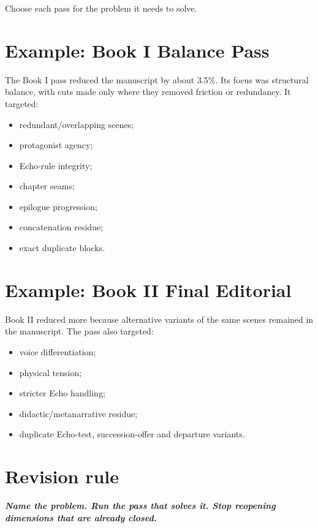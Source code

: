 \documentclass[11pt,oneside,openany]{book}
\renewenvironment{quote}{\begin{insightbox}\itshape}{\end{insightbox}}
\providecommand{\tightlist}{%
  \setlength{\itemsep}{0pt}\setlength{\parskip}{0pt}}
\begin{document}
Choose each pass for the problem it needs to solve.

\section{Example: Book I Balance Pass}\label{example-book-i-balance-pass}

The Book I pass reduced the manuscript by about 3.5\%. Its focus was structural balance, with cuts made only where they removed friction or redundancy. It targeted:

\begin{itemize}
\tightlist
\item
  redundant/overlapping scenes;
\item
  protagonist agency;
\item
  Echo-rule integrity;
\item
  chapter seams;
\item
  epilogue progression;
\item
  concatenation residue;
\item
  exact duplicate blocks.
\end{itemize}

\section{Example: Book II Final Editorial}\label{example-book-ii-final-editorial}

Book II reduced more because alternative variants of the same scenes remained in the manuscript. The pass also targeted:

\begin{itemize}
\tightlist
\item
  voice differentiation;
\item
  physical tension;
\item
  stricter Echo handling;
\item
  didactic/metanarrative residue;
\item
  duplicate Echo-test, succession-offer and departure variants.
\end{itemize}

\section{Revision rule}\label{revision-rule}

\begin{quote}
\textbf{Name the problem. Run the pass that solves it. Stop reopening dimensions that are already closed.}

\end{quote}
\end{document}
